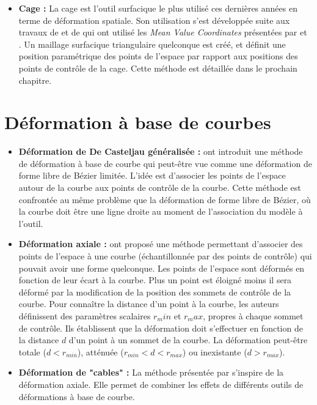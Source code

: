 \begin{itemize}
\item{\textbf{Cage :}} La cage est l'outil surfacique le plus utilisé ces
dernières années en terme de déformation spatiale. Son utilisation s'est
développée suite aux travaux de \cite{JSW05} et de \cite{FKR05} qui ont
utilisé les \textit{Mean Value Coordinates} présentées par \cite{Flo03} et
\cite{FKR05}. Un maillage surfacique triangulaire quelconque est créé, et
définit une position paramétrique des points de l'espace par rapport aux
positions des points de contrôle de la cage. Cette méthode est détaillée dans
le prochain chapitre.

\end{itemize}

\section{Déformation à base de courbes} 

\begin{itemize}

\item{\textbf{Déformation de De Casteljau généralisée :}} \cite{CR94} ont
introduit une méthode de déformation à base de courbe qui peut-être vue comme
une déformation de forme libre de Bézier limitée. L'idée est d'associer les
points de l'espace autour de la courbe aux points de contrôle de la courbe.
Cette méthode est confrontée au même problème que la déformation de forme
libre de Bézier, où la courbe doit être une ligne droite au moment de
l'association du modèle à l'outil.

\item{\textbf{Déformation axiale :}} \cite{LCJ94} ont proposé une méthode
permettant d'associer des points de l'espace à une courbe (échantillonnée par
des points de contrôle) qui pouvait avoir une forme quelconque. Les points de
l'espace sont déformés en fonction de leur écart à la courbe. Plus un point
est éloigné moins il sera déformé par la modification de la position des
sommets de contrôle de la courbe. Pour connaître la distance d'un point à la
courbe, les auteurs définissent des paramètres scalaires $r_min$ et $r_max$,
propres à chaque sommet de contrôle. Ils établissent que la déformation doit
s'effectuer en fonction de la distance $d$ d'un point à un sommet de la
courbe. La déformation peut-être totale ($d < r_{min}$), atténuée ($r_{min} <
d < r_{max}$) ou inexistante ($d > r_{max}$).

\item{\textbf{Déformation de "cables" :}} La méthode présentée par \cite{SF98}
s'inspire de la déformation axiale. Elle permet de combiner les effets de
différents outils de déformations à base de courbe.

\end{itemize}

